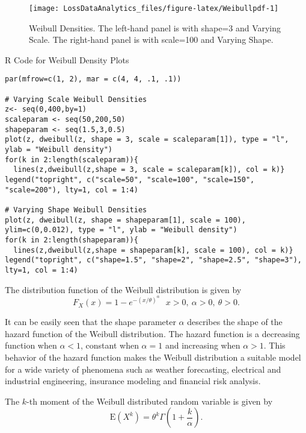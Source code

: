 \documentclass[]{book}
\theoremstyle{definition}
\theoremstyle{definition}
\theoremstyle{definition}
\theoremstyle{remark}
\begin{document}
\begin{figure}

{\centering \texttt{[image: LossDataAnalytics\_files/figure-latex/Weibullpdf-1]} 

}

\caption{Weibull Densities. The left-hand panel is with shape=3 and Varying Scale. The right-hand panel is with scale=100 and Varying Shape.}\label{fig:Weibullpdf}
\end{figure}

R Code for Weibull Density Plots

\hypertarget{display.ux20Weibullscale.2}{}
\begin{verbatim}
par(mfrow=c(1, 2), mar = c(4, 4, .1, .1))

# Varying Scale Weibull Densities
z<- seq(0,400,by=1)
scaleparam <- seq(50,200,50)
shapeparam <- seq(1.5,3,0.5)
plot(z, dweibull(z, shape = 3, scale = scaleparam[1]), type = "l", ylab = "Weibull density")
for(k in 2:length(scaleparam)){
  lines(z,dweibull(z,shape = 3, scale = scaleparam[k]), col = k)}
legend("topright", c("scale=50", "scale=100", "scale=150", "scale=200"), lty=1, col = 1:4)

# Varying Shape Weibull Densities
plot(z, dweibull(z, shape = shapeparam[1], scale = 100), ylim=c(0,0.012), type = "l", ylab = "Weibull density")
for(k in 2:length(shapeparam)){
  lines(z,dweibull(z,shape = shapeparam[k], scale = 100), col = k)}
legend("topright", c("shape=1.5", "shape=2", "shape=2.5", "shape=3"), lty=1, col = 1:4)
\end{verbatim}

The distribution function of the Weibull distribution is given by
\[F_{X}\left( x \right) = 1 - e^{- \left( x / \theta \right)^{\alpha}}  \ \ \ x >  0,\ \alpha >  0,\ \theta > 0.\]

It can be easily seen that the shape parameter \(\alpha\) describes the
shape of the hazard function of the Weibull distribution. The hazard
function is a decreasing function when \(\alpha < 1\), constant when
\(\alpha = 1\) and increasing when \(\alpha > 1\). This behavior of the
hazard function makes the Weibull distribution a suitable model for a
wide variety of phenomena such as weather forecasting, electrical and
industrial engineering, insurance modeling and financial risk analysis.

The \(k\)-th moment of the Weibull distributed random variable is given
by
\[\mathrm{E}\left( X^{k} \right) = \theta^{k}\Gamma\left( 1 + \frac{k}{\alpha} \right) .\]
\end{document}
